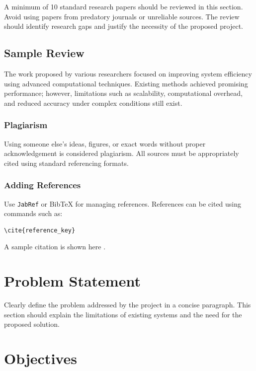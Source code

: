 A minimum of 10 standard research papers should be reviewed in this section. Avoid using papers from predatory journals or unreliable sources. The review should identify research gaps and justify the necessity of the proposed project.

\subsection{Sample Review}

The work proposed by various researchers focused on improving system efficiency using advanced computational techniques. Existing methods achieved promising performance; however, limitations such as scalability, computational overhead, and reduced accuracy under complex conditions still exist.

\subsubsection{Plagiarism}

Using someone else's ideas, figures, or exact words without proper acknowledgement is considered plagiarism. All sources must be appropriately cited using standard referencing formats.

\subsubsection{Adding References}

Use \texttt{JabRef} or BibTeX for managing references. References can be cited using commands such as:

\begin{verbatim}
\cite{reference_key}
\end{verbatim}

A sample citation is shown here \cite{Razavi2000}.


\section{Problem Statement}

Clearly define the problem addressed by the project in a concise paragraph. This section should explain the limitations of existing systems and the need for the proposed solution.


\section{Objectives}

